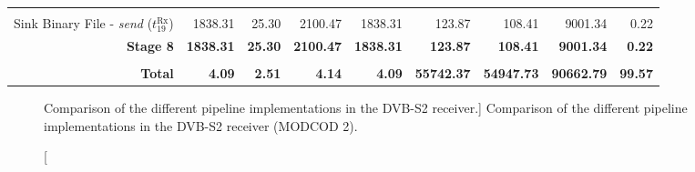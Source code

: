 \begin{table}[htp]
{{\begin{tabular}{r | r r r r  | r r r | r}
                                                                              &                  &                   &                   &                                         &                   &                   &                   &                \\
    \rowcolor{Paired-7!15}
                 Sink Binary File -          \emph{send} ($t^\text{Rx}_{19}$) &         1838.31  &            25.30  &          2100.47  &                                1838.31  &           123.87  &           108.41  &          9001.34  &          0.22  \\ \hline
                                                             \textbf{Stage 8} & \textbf{1838.31} &    \textbf{25.30} &  \textbf{2100.47} &                        \textbf{1838.31} &   \textbf{123.87} &   \textbf{108.41} &  \textbf{9001.34} &  \textbf{0.22} \\ %
                                                                              &                  &                   &                   &                                         &                   &                   &                   &                \\ \hline \hline
                                                               \textbf{Total} &    \textbf{4.09} &     \textbf{2.51} &     \textbf{4.14} &                           \textbf{4.09} & \textbf{55742.37} & \textbf{54947.73} & \textbf{90662.79} & \textbf{99.57} \\ %
  \end{tabular}
  }}
\end{table}

\begin{figure}[htp]
  \centering
  \quad
  \caption
    [Comparison of the different pipeline implementations in the DVB-S2 receiver.]
    {Comparison of the different pipeline implementations in the DVB-S2 receiver (MODCOD 2).}
  \label{fig:dvbs2_pipeline}
\end{figure}

